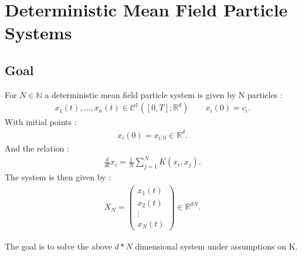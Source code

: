 \chapter{Deterministic Mean Field Particle Systems}
\section{Goal}
\begin{definition}
  For $N \in  \mathbb{N}$ a deterministic mean field particle system is given by N particles : 
  \begin{align*}
   x_1(t),\ldots ,x_n(t) \in  \mathcal{C}^{1}([0,T];\mathbb{R}^{d } )  \qquad x_i(0) = c_i
  .\end{align*}
  With initial points : 
  \begin{align*}
    x_i(0) = x_{i,0} \in \mathbb{R}^{d} 
  .\end{align*}
  And the relation : 
  \begin{align*}
    \frac{d}{dt} x_{i} = \frac{1}{N} \sum_{j=1}^{N}  K(x_i,x_{j})
  .\end{align*}
  The system is then given by : 
  \begin{align*}
    X_N = \begin{pmatrix} x_1(t) \\ x_2(t) \\ \vdots \\ x_N(t)  \end{pmatrix} \in \mathbb{R}^{dN} 
  .\end{align*}
\end{definition}
The goal is to solve the above $d*N$ dimensional system under assumptions on K.
